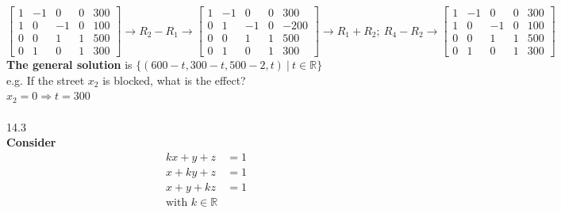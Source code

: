 \documentclass[]{article}
\begin{document}
                $$
                \left[\begin{array}{cccc|c}
                    {1}&{-1}&{0}&{0}&{300}\\
                    {1}&{0}&{-1}&{0}&{100}\\
                    {0}&{0}&{1}&{1}&{500}\\
                    {0}&{1}&{0}&{1}&{300}
                \end{array}\right]\rightarrow R_2-R_1\rightarrow
                \left[\begin{array}{cccc|c}                                                                                                          
                    {1}&{-1}&{0}&{0}&{300}\\
                    {0}&{1}&{-1}&{0}&{-200}\\
                    {0}&{0}&{1}&{1}&{500}\\
                    {0}&{1}&{0}&{1}&{300}
                \end{array}\right]\rightarrow
              R_1+R_2;~R_4-R_2\rightarrow
                \left[\begin{array}{cccc|c}                                                                                                          
                    {1}&{-1}&{0}&{0}&{300}\\
                    {1}&{0}&{-1}&{0}&{100}\\
                    {0}&{0}&{1}&{1}&{500}\\
                    {0}&{1}&{0}&{1}&{300}
                  \end{array}\right]
                $$
                {\bf The general solution} is
                $\{(600-t,300-t,500-2,t)~|~t\in\mathbb{R}\}$\\
                e.g. If the street $x_2$ is blocked, what is the
                effect?\\
                $x_2=0\Rightarrow t=300$\\\\
                \large{14.3}\\
                \normalsize
                {\bf Consider}
                \begin{align*}
                  kx+y+z&=1\\
                  x+ky+z&=1\\
                  x+y+kz&=1\\
                  \text{with }k\in\mathbb{R}
                \end{align*}
\end{document}
